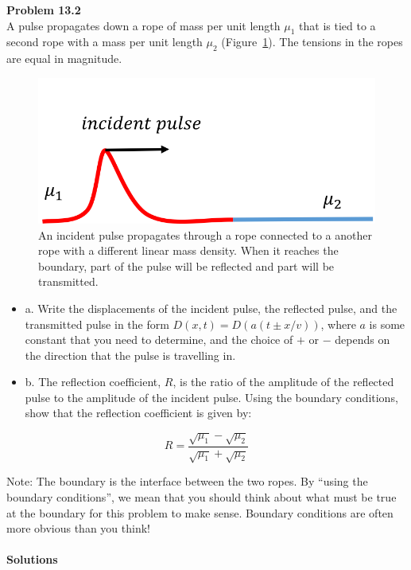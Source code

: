 \begin{framed}
\textbf{Problem 13.2}\\
A pulse propagates down a rope of mass per unit length $\mu_1$ that is tied to a second rope with a mass per unit length $\mu_2$ (Figure~\ref{fig:waves:reflectioncoeffgiven}). The tensions in the ropes are equal in magnitude.

\begin{figure}[!htbp]
\centering
\includegraphics[width=0.5\linewidth]{files/reflectioncoeffgiven-307657fb762eb4d22dfac7c2f7aa29f3.png}
\caption[]{An incident pulse propagates through a rope connected to a another rope with a different linear mass density. When it reaches the boundary, part of the pulse will be reflected and part will be transmitted.}
\label{fig:waves:reflectioncoeffgiven}
\end{figure}

\begin{itemize}
\item a. Write the displacements of the incident pulse, the reflected pulse, and the transmitted pulse in the form $D(x,t)=D(a(t\pm x/v))$, where $a$ is some constant that you need to determine, and the choice of $+$ or $-$ depends on the direction that the pulse is travelling in.
\item b. The reflection coefficient, $R$, is the ratio of the amplitude of the reflected pulse to the amplitude of the incident pulse. Using the boundary conditions, show that the reflection coefficient is given by:
\end{itemize}
\begin{equation}
R=\frac{\sqrt{\mu_1}-\sqrt{\mu_2}}{\sqrt{\mu_1}+\sqrt{\mu_2}}
\end{equation}

Note: The boundary is the interface between the two ropes. By ``using the boundary conditions'', we mean that you should think about what must be true at the boundary for this problem to make sense. Boundary conditions are often more obvious than you think!
\end{framed}

\paragraph{Solutions}

